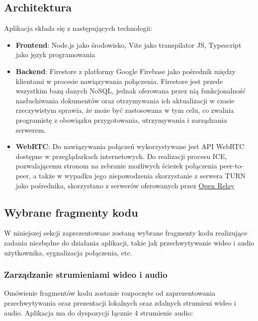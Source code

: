 \subsection{Architektura}

Aplikacja składa się z następujących technologii:

\begin{itemize}
    \item \textbf{Frontend}: Node.js jako środowisko, Vite jako transpilator JS, Typescript jako
          język programowania
    \item \textbf{Backend}: Firestore z platformy Google Firebase jako pośrednik między klientami w
          procesie nawiązywania połączenia. Firestore jest przede wszystkim bazą danych NoSQL,
          jednak oferowana przez nią funkcjonalność nasłuchiwania dokumentów oraz otrzymywania ich
          aktualizacji w czasie rzeczywistym sprawia, że może być zastosowana w tym celu, co zwalnia
          programistę z obowiązku przygotowania, utrzymywania i zarządzania serwerem.
    \item \textbf{WebRTC}: Do nawiązywania połączeń wykorzystywane jest API WebRTC dostępne w
          przeglądarkach internetowych. Do realizacji procesu ICE, pozwalającemu stronom na zebranie
          możliwych ścieżek połączenia peer-to-peer, a także w wypadku jego niepowodzenia
          skorzystanie z serwera TURN jako pośrednika, skorzystano z serwerów oferowanych przez
          \href{https://www.metered.ca/tools/openrelay/}{Open Relay}
\end{itemize}

\subsection{Wybrane fragmenty kodu}

W niniejszej sekcji zaprezentowane zostaną wybrane fragmenty kodu realizujące zadania niezbędne do
działania aplikacji, takie jak przechwytywanie wideo i audio użytkownika, sygnalizacja połączenia,
etc.

\subsubsection{Zarządzanie strumieniami wideo i audio}

Omówienie fragmentów kodu zostanie rozpoczęte od zaprezentowania przechwytywania oraz prezentacji
lokalnych oraz zdalnych strumieni wideo i audio. Aplikacja ma do dyspozycji łącznie 4 strumienie
audio:

